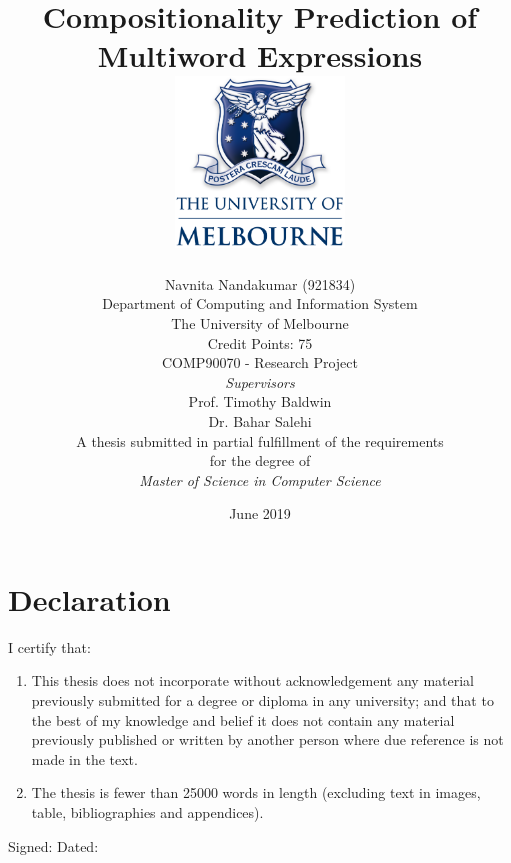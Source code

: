 \documentclass[12pt,a4paper, margin=1in]{report}
\begin{document}
\title{\textbf{Compositionality Prediction of Multiword Expressions}\\ \bigskip \includegraphics[width=45mm]{logo.png} }
\author{ \Large {Navnita Nandakumar (921834)} \\
Department of Computing and Information System \\ \medskip
The University of Melbourne \\
\large Credit Points: 75 \\ \medskip \large COMP90070 - Research Project \\
\large \textit{Supervisors} \\ \large Prof. Timothy Baldwin \\ \medskip Dr. Bahar Salehi \\ A thesis submitted in partial fulfillment of the requirements \\ for the degree of \\ \textit{Master of Science in Computer Science}}
\date{June 2019}

\maketitle
\chapter*{\centering \LARGE Declaration}
I certify that:
\begin{enumerate}
\item This thesis does not incorporate without acknowledgement any material previously submitted for a degree or diploma in any university; and that to the best of my knowledge and belief it does not contain any material previously published or written by another person where due reference is not made in the text.
\item The thesis is fewer than 25000 words in length (excluding text in images, table, bibliographies and appendices).
\end{enumerate}
\bigskip
\bigskip
Signed: \hrulefill Dated: \hrulefill
 
\end{document}
